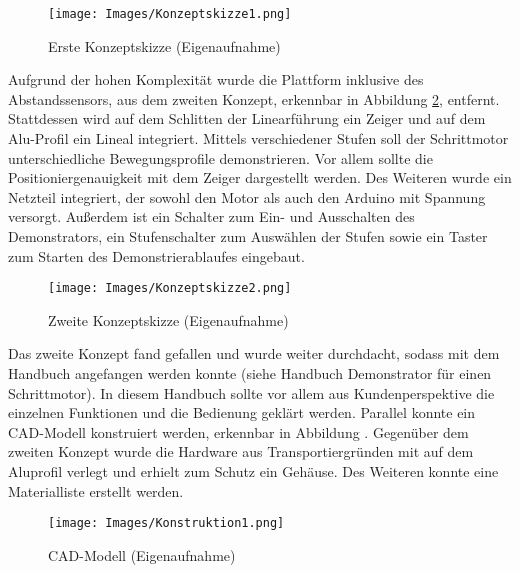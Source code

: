 \begin{figure}[htb]
	\begin{center}
		\texttt{[image: Images/Konzeptskizze1.png]}
		\caption{Erste Konzeptskizze (Eigenaufnahme)} \label{ErsteKonzeptskizze}
\end{center}
\end{figure}

Aufgrund der hohen Komplexität wurde die Plattform inklusive des Abstandssensors, aus dem zweiten Konzept, erkennbar in Abbildung \ref{ZweiteKonzeptskizze}, entfernt. Stattdessen wird auf dem Schlitten der Linearführung ein Zeiger und auf dem Alu-Profil ein Lineal integriert. Mittels verschiedener Stufen soll der Schrittmotor unterschiedliche Bewegungsprofile demonstrieren. Vor allem sollte die Positioniergenauigkeit mit dem Zeiger dargestellt werden. Des Weiteren wurde ein Netzteil integriert, der sowohl den Motor als auch den Arduino mit Spannung versorgt. Außerdem ist ein Schalter zum Ein- und Ausschalten des Demonstrators, ein Stufenschalter zum Auswählen der Stufen sowie ein Taster zum Starten des Demonstrierablaufes eingebaut.  

\begin{figure}[H]
	\begin{center}
		\texttt{[image: Images/Konzeptskizze2.png]}
		\caption{Zweite Konzeptskizze (Eigenaufnahme)} \label{ZweiteKonzeptskizze}
	\end{center}
\end{figure}

Das zweite Konzept fand gefallen und wurde weiter durchdacht, sodass mit dem Handbuch angefangen werden konnte (siehe Handbuch Demonstrator für einen Schrittmotor). In diesem Handbuch sollte vor allem aus Kundenperspektive die einzelnen Funktionen und die Bedienung geklärt werden. Parallel konnte ein CAD-Modell konstruiert werden, erkennbar in Abbildung . Gegenüber dem zweiten Konzept wurde die Hardware aus Transportiergründen mit auf dem Aluprofil verlegt und erhielt zum Schutz ein Gehäuse. Des Weiteren konnte eine Materialliste erstellt werden. 

\begin{figure}[H]
	\begin{center}
		\texttt{[image: Images/Konstruktion1.png]}
		\caption{CAD-Modell (Eigenaufnahme)} \label{CADMOD}
	\end{center}
\end{figure} 





